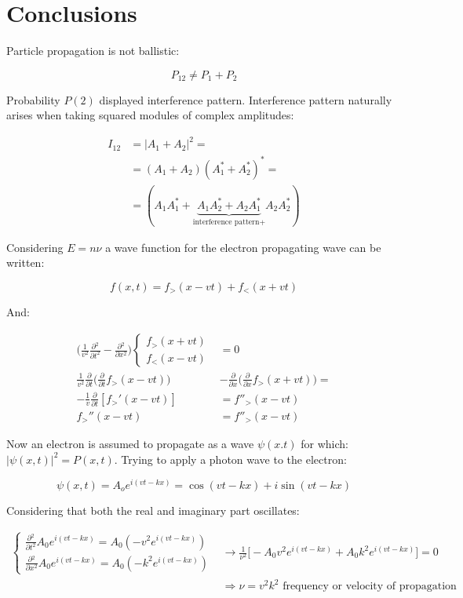 \section{Conclusions}
Particle propagation is not ballistic:

$$P_{12} \neq P_1 + P_2$$

Probability $P(2)$ displayed interference pattern.
Interference pattern naturally arises when taking squared modules of complex amplitudes:

\begin{align*}
  I_{12} &= |A_1 + A_2|^2=\\
         &=(A_1 + A_2)(A_1^*+A_2^*)^*=\\
         &=(A_1A_1^*+\underbrace{A_1A_2^*+A_2A_1^*}_{\text{interference pattern+}}A_2A_2^*)
\end{align*}

Considering $E=n\nu$ a wave function for the electron propagating wave can be written:

$$f(x,t) = f_>(x-vt)+f_<(x+vt)$$

And:

\begin{align*}
  \biggl(\frac{1}{v^2}\frac{\partial {^2}}{\partial {t^2}}-\frac{\partial {^2}}{\partial {x^2}}\biggr)\begin{cases}f_>(x+vt)\\f_<(x-vt)\end{cases} &= 0\\
  \frac{1}{v^2}\frac{\partial {}}{\partial {t}}\biggl(\frac{\partial {}}{\partial {t}}f_>(x-vt)\biggr)&-\frac{\partial {}}{\partial {x}}\biggl(\frac{\partial {}}{\partial {x}}f_>(x+vt)\biggr)=\\
  -\frac{1}{v}\frac{\partial {}}{\partial {t}}[f_>'(x-vt)]&=f''_>(x-vt)\\
  f_>''(x-vt) &=f''_>(x-vt)
\end{align*}

Now an electron is assumed to propagate as a wave $\psi(x.t)$ for which: $|\psi(x,t)|^2 = P(x,t)$.
Trying to apply a photon wave to the electron:

$$\psi(x,t) = A_oe^{i(vt-kx)} = \cos(vt-kx) + i\sin(vt - kx)$$

Considering that both the real and imaginary part oscillates:

\begin{align*}
  \begin{cases}\frac{\partial {^2}}{\partial {t^2}}A_0e^{i(vt-kx)} = A_0(-v^2e^{i(vt-kx)})\\\frac{\partial {^2}}{\partial {x^2}}A_0e^{i(vt-kx)} = A_0(-k^2e^{i(vt-kx)})\end{cases}&\rightarrow \frac{1}{\nu^2}\biggl[-A_0v^2e^{i(vt-kx)}+A_0k^2e^{i(vt-kx)}\biggr] = 0\\
                                                                                                                                                                                  &\Rightarrow \nu = v^2k^2\text{ frequency or velocity of propagation}
\end{align*}

